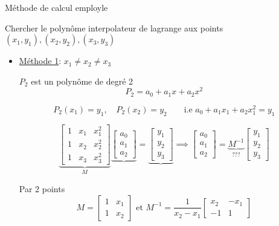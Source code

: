 \begin{eg}
   Méthode de calcul employle 
   \par
   Chercher le polynôme interpolateur de lagrange aux points $(x_1, y_1), (x_2, y_2), (x_3, y_3)$
   \begin{itemize}
       \item \underline{Méthode 1}: $x_1 \neq x_2 \neq x_3$ \par
           $P_2$ est un polynôme de degré 2
           \[
           P_2 = a_0 + a_1x + a_2x^2
           \] 
           \begin{lemma}
              \[
              P_2(x_1) = y_1, \quad P_2(x_2) = y_2 \qquad \text{i.e } a_0 + a_1x_1 + a_2x_1^2 = y_1
              \]  
           \end{lemma}
           \[
               \underbrace{
                   \begin{bmatrix} 
                       1 & x_1 & x_1^2\\
                       1 & x_2 & x_2^2\\
                       1 & x_3 & x_3^2
                   \end{bmatrix} 
               }_{M}\underbrace{\begin{bmatrix} a_0 \\ a_1 \\ a_2 \end{bmatrix} }_{} = \underbrace{\begin{bmatrix} y_1 \\ y_2 \\ y_3 \end{bmatrix} }_{} \implies \begin{bmatrix} a_0 \\ a_1 \\ a_2 \end{bmatrix} = \underbrace{M^{-1}}_{???}\begin{bmatrix} y_1 \\ y_2 \\ y_3 \end{bmatrix} 
           \] 
           \begin{remark}
              Par 2 points 
              \[
                  M = \begin{bmatrix} 1 & x_1 \\ 1 & x_2 \end{bmatrix} \text{ et } M^{-1} = \frac{1}{x_2 - x_1}\begin{bmatrix} x_2 & -x_1\\ -1 & 1 \end{bmatrix} 
\]
\end{remark}
\end{itemize}
\end{eg}
